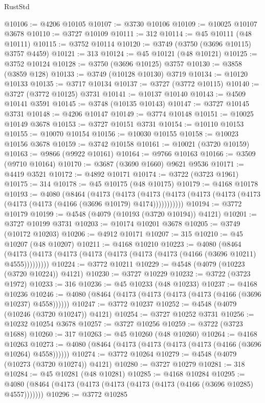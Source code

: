 \begin{lexlean}{RustStd}
\begin{coremodule}
@10106 := @4206 @10105
@10107 := @3730 @10106
@10109 := @10025 @10107 @3678
@10110 := @3727 @10109
@10111 := 312
@10114 := @45 @10111 (@48 @10111)
@10115 := @3752 @10114
@10120 := @3749 (@3750 (@3696 @10115) @3757 @4459)
@10121 := 313
@10124 := @45 @10121 (@48 @10121)
@10125 := @3752 @10124
@10128 := @3750 (@3696 @10125) @3757
@10130 := @3858 (@3859 @128)
@10133 := @3749 (@10128 @10130) @3719
@10134 := @10120 @10133
@10135 := @3717 @10134
@10137 := @3727 (@3772 @10115)
@10140 := @3727 (@3772 @10125) @3731
@10141 := @10137 @10140
@10143 := @4509 @10141 @3591
@10145 := @3748 (@10135 @10143)
@10147 := @3727 @10145 @3731
@10148 := @4206 @10147
@10149 := @3774 @10148
@10151 := @10025 @10149 @3678
@10153 := @3727 @10151 @3731
@10154 := @10110 @10153
@10155 := @10070 @10154
@10156 := @10030 @10155
@10158 := @10023 @10156 @3678
@10159 := @3742 @10158
@10161 := @10021 (@3720 @10159)
@10163 := @9866 (@9922 @10161)
@10164 := @9766 @10163
@10166 := @3509 (@9710 @10164)
@10170 := @3687 (@3690 @1660) @9621 @9536
@10171 := @4419 @3521
@10172 := @4892 @10171
@10174 := @3722 (@3723 @1961)
@10175 := 314
@10178 := @45 @10175 (@48 @10175)
@10179 := @4168 @10178
@10193 := @4080
    (@8464
      (@4173
        (@4173
          (@4173 (@4173 (@4173 (@4173 (@4173 (@4173 (@4173 (@4166 (@3696 @10179) @4174)))))))))))
@10194 := @3772 @10179
@10199 := @4548 (@4079 (@10193 (@3720 @10194)) @4121)
@10201 := @3727 @10199 @3731
@10203 := @10174 @10201 @3678
@10205 := @3749 (@10172 @10203)
@10206 := @4912 @10171
@10207 := 315
@10210 := @45 @10207 (@48 @10207)
@10211 := @4168 @10210
@10223 := @4080
    (@8464 (@4173 (@4173 (@4173 (@4173 (@4173 (@4173 (@4173 (@4166 (@3696 @10211) @4555)))))))))
@10224 := @3772 @10211
@10229 := @4548 (@4079 (@10223 (@3720 @10224)) @4121)
@10230 := @3727 @10229
@10232 := @3722 (@3723 @1972)
@10233 := 316
@10236 := @45 @10233 (@48 @10233)
@10237 := @4168 @10236
@10246 := @4080 (@8464 (@4173 (@4173 (@4173 (@4173 (@4166 (@3696 @10237) @4558))))))
@10247 := @3772 @10237
@10252 := @4548 (@4079 (@10246 (@3720 @10247)) @4121)
@10254 := @3727 @10252 @3731
@10256 := @10232 @10254 @3678
@10257 := @3727 @10256
@10259 := @3722 (@3723 @1688)
@10260 := 317
@10263 := @45 @10260 (@48 @10260)
@10264 := @4168 @10263
@10273 := @4080 (@8464 (@4173 (@4173 (@4173 (@4173 (@4166 (@3696 @10264) @4558))))))
@10274 := @3772 @10264
@10279 := @4548 (@4079 (@10273 (@3720 @10274)) @4121)
@10280 := @3727 @10279
@10281 := 318
@10284 := @45 @10281 (@48 @10281)
@10285 := @4168 @10284
@10295 := @4080 (@8464 (@4173 (@4173 (@4173 (@4173 (@4173 (@4166 (@3696 @10285) @4557)))))))
@10296 := @3772 @10285

\end{coremodule}
\end{lexlean}

